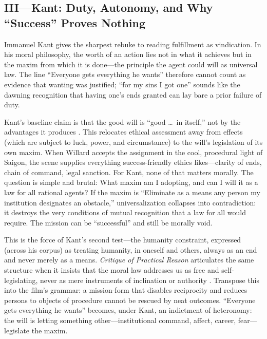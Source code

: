 \subsection*{III—Kant: Duty, Autonomy, and Why ``Success'' Proves Nothing}
\label{ssec:iii-kant}
Immanuel Kant gives the sharpest rebuke to reading fulfillment as vindication. In his moral
philosophy, the worth of an action lies not in what it achieves but in the maxim from which
it is done—the
principle the agent could will as universal law. The line ``Everyone gets everything he wants''
therefore cannot count as evidence that wanting was justified; ``for my sins I got one'' sounds
like the dawning recognition that having one's ends granted can lay bare a prior failure of
duty.

Kant's baseline claim is that the good will is ``good \ldots\ in itself,'' not by the
advantages it produces \parencite[p.~27]{KantCPrR1996}. This relocates ethical assessment away
from effects (which are subject to luck, power, and circumstance) to the will's legislation of
its own maxim. When Willard accepts the assignment in the cool, procedural light of Saigon,
the scene supplies everything success-friendly ethics likes—clarity of ends, chain of command,
legal sanction. For Kant, none of that matters morally. The question is simple and brutal:
What maxim am I adopting, and can I will it as a law for all rational agents? If the maxim is
``Eliminate as a means any person my institution designates an obstacle,'' universalization
collapses into contradiction: it destroys the very conditions of mutual recognition that a law
for all would require. The mission can be ``successful'' and still be morally void.

This is the force of Kant's second test—the humanity constraint, expressed (across his corpus)
as treating humanity, in oneself and others, always as an end and never merely as a means.
\emph{Critique of Practical Reason} articulates the same structure when it insists that the
moral law addresses us as free and self-legislating, never as mere instruments of inclination
or authority \parencite[pp.~30--33]{KantCPrR1996}. Transpose this into the film's grammar:
a mission-form that disables reciprocity and reduces persons to objects of procedure cannot be
rescued by neat outcomes. ``Everyone gets everything he wants'' becomes, under Kant, an
indictment of heteronomy: the will is letting something other—institutional command, affect,
career, fear—legislate the maxim.

